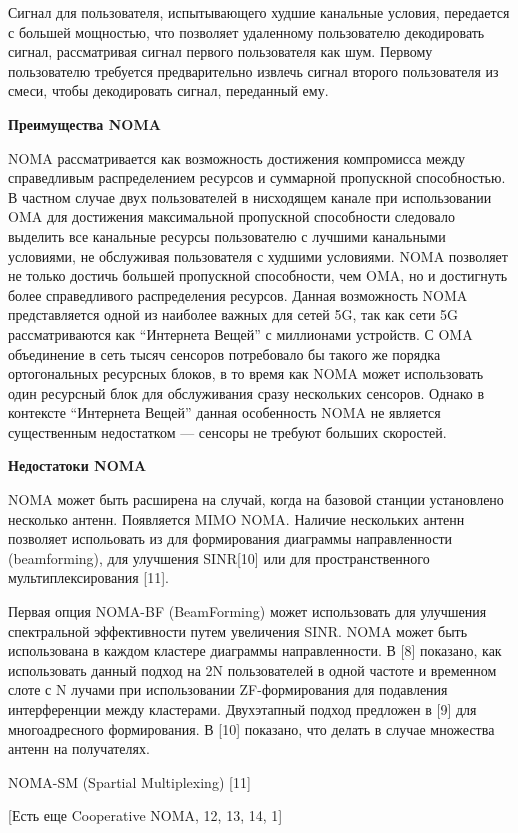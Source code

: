\documentclass{book}
\numberwithin{theorem}{chapter}
\numberwithin{statement}{chapter}
\numberwithin{lemma}{chapter}
\theoremstyle{definition}
\numberwithin{task}{chapter}
\theoremstyle{remark}
\numberwithin{example}{chapter}
\theoremstyle{definition}
\numberwithin{definition}{chapter}
\theoremstyle{remark}
\theoremstyle{remark}
\numberwithin{lyrics}{section}
\begin{document}
	Сигнал для пользователя, испытывающего худшие канальные условия, передается с большей мощностью, что позволяет удаленному пользователю декодировать сигнал, рассматривая сигнал первого пользователя как шум. Первому пользователю требуется предварительно извлечь сигнал второго пользователя из смеси, чтобы декодировать сигнал, переданный ему.
	
	\textbf{Преимущества NOMA}
	
	NOMA рассматривается как возможность достижения компромисса между справедливым распределением ресурсов и суммарной пропускной способностью. В частном случае двух пользователей в нисходящем канале при использовании OMA для достижения максимальной пропускной способности следовало выделить все канальные ресурсы пользователю с лучшими канальными условиями, не обслуживая пользователя с худшими условиями. NOMA позволяет не только достичь большей пропускной способности, чем OMA, но и достигнуть более справедливого распределения ресурсов. Данная возможность NOMA представляется одной из наиболее важных для сетей 5G, так как сети 5G рассматриваются как ``Интернета Вещей'' с миллионами устройств. С OMA объединение в сеть тысяч сенсоров потребовало бы такого же порядка ортогональных ресурсных блоков, в то время как NOMA может использовать один ресурсный блок для обслуживания сразу нескольких сенсоров. Однако в контексте ``Интернета Вещей'' данная особенность NOMA не является существенным недостатком --- сенсоры не требуют больших скоростей.
	
	\textbf{Недостатоки NOMA}
	
	NOMA может быть расширена на случай, когда на базовой станции установлено несколько антенн. Появляется MIMO NOMA. Наличие нескольких антенн позволяет испольовать из для формирования диаграммы направленности (beamforming), для улучшения SINR[10] или для пространственного мультиплексирования [11].
	
	Первая опция NOMA-BF (BeamForming) может использовать для улучшения спектральной эффективности путем увеличения SINR. 
	NOMA может быть использована в каждом кластере диаграммы направленности. В [8] показано, как использовать данный подход на 2N пользователей в одной частоте и временном слоте с N лучами при использовании ZF-формирования для подавления интерференции между кластерами. Двухэтапный подход предложен в [9] для многоадресного формирования. В [10] показано, что делать в случае множества антенн на получателях.
	
	NOMA-SM (Spartial Multiplexing) [11]
	
	[Есть еще Cooperative NOMA, 12, 13, 14, 1]
	
\end{document}

